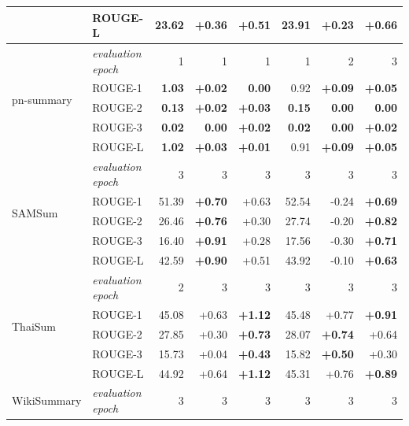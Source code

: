\begin{table}[b!]
{\begin{tabular}{llrrrrrr}
 &    ROUGE-L & 23.62 &     +0.36 &     \textbf{+0.51} &  23.91 &         +0.23 &         \textbf{+0.66} \\
 \midrule
\multirow{5}{*}{pn-summary \citep{Farahani_2021} } 
 & \textit{evaluation epoch} &  1 &  1 &  1 &  1 &  2 &  3 \\
 &    ROUGE-1 &  \textbf{1.03} &     \textbf{+0.02} &     \textbf{0.00} &   0.92 &         \textbf{+0.09} &         \textbf{+0.05} \\
 &    ROUGE-2 &  \textbf{0.13} &     \textbf{+0.02} &     \textbf{+0.03} &   \textbf{0.15} &         \textbf{0.00} &         \textbf{0.00} \\
 &    ROUGE-3 &  \textbf{0.02} &      \textbf{0.00} &     \textbf{+0.02} &   \textbf{0.02} &         \textbf{0.00} &         \textbf{+0.02} \\
 &    ROUGE-L &  \textbf{1.02} &     \textbf{+0.03} &     \textbf{+0.01} &   0.91 &         \textbf{+0.09} &         \textbf{+0.05} \\
 \midrule
\multirow{5}{*}{SAMSum \citep{Gliwa_2019}} 
 & \textit{evaluation epoch} & 3 & 3 & 3 &  3 &  3 &  3 \\
 &    ROUGE-1 & 51.39 &     \textbf{+0.70} &     +0.63 &  52.54 &        -0.24 &         \textbf{+0.69}  \\
 &    ROUGE-2 & 26.46 &     \textbf{+0.76} &     +0.30 &  27.74 &        -0.20 &         \textbf{+0.82} \\
 &    ROUGE-3 & 16.40 &     \textbf{+0.91} &     +0.28 &  17.56 &        -0.30 &         \textbf{+0.71} \\
 &    ROUGE-L & 42.59 &     \textbf{+0.90} &     +0.51 &  43.92 &        -0.10 &         \textbf{+0.63} \\
 \midrule
\multirow{5}{*}{ThaiSum \citep{chumpolsathien_2020}} 
 & \textit{evaluation epoch} & 2 & 3 & 3 &  3 &  3 &  3 \\
 &    ROUGE-1 & 45.08 &     +0.63 &     \textbf{+1.12} &  45.48 &         +0.77 &         \textbf{+0.91} \\
 &    ROUGE-2 & 27.85 &     +0.30 &     \textbf{+0.73} &  28.07 &         \textbf{+0.74} &         +0.64 \\
 &    ROUGE-3 & 15.73 &     +0.04 &     \textbf{+0.43} &  15.82 &         \textbf{+0.50} &         +0.30 \\
 &    ROUGE-L & 44.92 &     +0.64 &     \textbf{+1.12} &  45.31 &         +0.76 &         \textbf{+0.89} \\
 \midrule
\multirow{5}{*}{WikiSummary \citep{Bert2BertWikiSummaryPersian}} 
 & \textit{evaluation epoch} & 3 & 3 & 3 &  3 &  3 &  3 \\

\end{tabular}}
\end{table}
